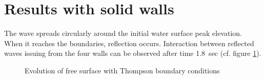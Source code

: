 \section{Results with solid walls}
%

The wave spreads circularly around the initial water surface peak elevation.
When it reaches the boundaries, reflection
occurs. Interaction between reflected waves issuing from the four walls can be
observed after time 1.8~sec (cf. figure \ref{t2d:gouttedo:walls_evol}).

\begin{figure}[H]
\begin{minipage}[t]{0.50\textwidth}
 \centering
\end{minipage}%
\begin{minipage}[t]{0.50\textwidth}
 \centering
\end{minipage}
\begin{minipage}[t]{0.50\textwidth}
 \centering
\end{minipage}%
\begin{minipage}[t]{0.50\textwidth}
 \centering
\end{minipage}
\begin{minipage}[t]{0.50\textwidth}
 \centering
\end{minipage}%
\begin{minipage}[t]{0.50\textwidth}
 \centering
\end{minipage}
\begin{minipage}[t]{0.50\textwidth}
 \centering
\end{minipage}%
\begin{minipage}[t]{0.50\textwidth}
 \centering
\end{minipage}
\caption{Evolution of free surface with Thompson boundary conditions}
\label{t2d:gouttedo:walls_evol}
\end{figure}

